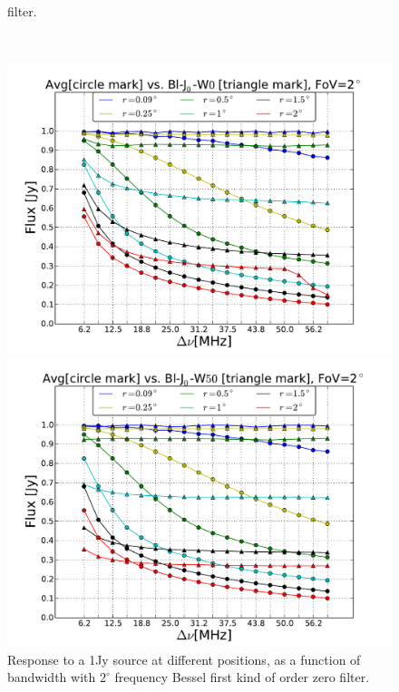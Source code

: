 \documentclass[useAMS,usenatbib]{mn2e}
\begin{document}
\begin{figure}
\begin{minipage}{0.36\linewidth}
{filter.}
        \label{fig:max-integ-freq-sinc-w1x50-fov2}
        \end{minipage}\\
  \begin{minipage}{0.36\linewidth}\includegraphics[width=1\textwidth]{./Figures/max-integ-freq-bessel-w1x1-fov2.pdf}
        \caption{Response to a 1Jy source at different positions, as a function of bandwidth with $2^{\circ}$ frequency Bessel first kind 
of 
  order zero filter.}
        \label{fig:max-integ-freq-bessel-w1x1-fov2}
        \end{minipage}
  \hspace{1cm}
  \begin{minipage}{0.36\linewidth}\includegraphics[width=1\textwidth]{./Figures/max-integ-freq-bessel-w1x50-fov2.pdf}

\end{minipage}
\end{figure}
\end{document}
